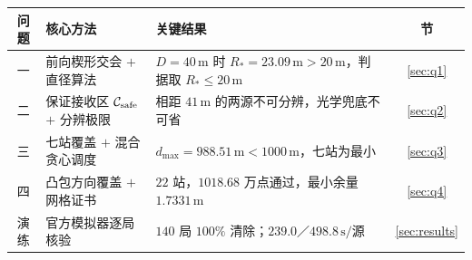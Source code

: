 \documentclass[withoutpreface,bwprint]{cumcmthesis}
\newcommand{\mecr}{R_{*}}
\newcommand{\msec}{\,\mathrm{s}}
\newcommand{\mmet}{\,\mathrm{m}}
\begin{document}
\par\vspace{0.25em}
{\small
\noindent\begin{tabularx}{\textwidth}{@{}c L L c@{}}
\toprule[1.5pt]
问题 & 核心方法 & 关键结果 & 节 \\
\midrule[1pt]
一 & 前向楔形交会 $+$ 直径算法 & $D=40\mmet$ 时 $\mecr=23.09\mmet>20\mmet$，判据取 $\mecr\le20\mmet$ & \ref{sec:q1} \\
二 & 保证接收区 $\mathcal C_{\rm safe}$ $+$ 分辨极限 & 相距 $41\mmet$ 的两源不可分辨，光学兜底不可省 & \ref{sec:q2} \\
三 & 七站覆盖 $+$ 混合贪心调度 & $d_{\max}=988.51\mmet<1000\mmet$，七站为最小 & \ref{sec:q3} \\
四 & 凸包方向覆盖 $+$ 网格证书 & $22$ 站，$1018.68$ 万点通过，最小余量 $1.7331\mmet$ & \ref{sec:q4} \\
演练 & 官方模拟器逐局核验 & $140$ 局 $100\%$ 清除；$239.0$／$498.8\msec/$源 & \ref{sec:results} \\
\bottomrule[1.5pt]
\end{tabularx}}













\end{document}
